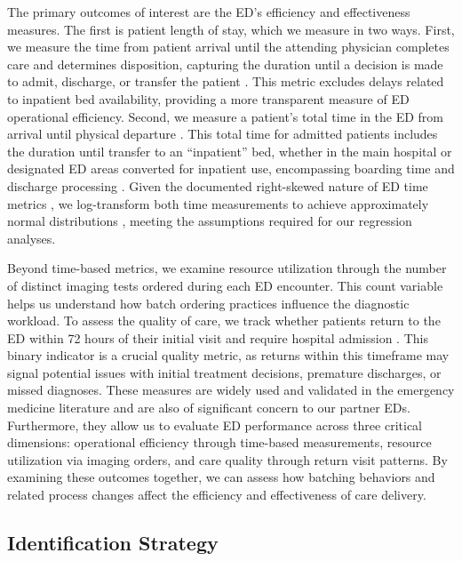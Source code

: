 \documentclass[,,nonblindrev]{informs}
\begin{document}
The primary outcomes of interest are the ED's efficiency and
effectiveness measures. The first is patient length of stay, which we
measure in two ways. First, we measure the time from patient arrival
until the attending physician completes care and determines disposition,
capturing the duration until a decision is made to admit, discharge, or
transfer the patient \citep{Feizi2023}. This metric excludes delays
related to inpatient bed availability, providing a more transparent
measure of ED operational efficiency. Second, we measure a patient's
total time in the ED from arrival until physical departure
\citep{Lim2024}. This total time for admitted patients includes the
duration until transfer to an ``inpatient'' bed, whether in the main
hospital or designated ED areas converted for inpatient use,
encompassing boarding time and discharge processing \citep{Feizi2023}.
Given the documented right-skewed nature of ED time metrics
\citep{Song2015}, we log-transform both time measurements to achieve
approximately normal distributions
\citep[\citet{Saghafian2024}]{Brown2005}, meeting the assumptions
required for our regression analyses.

Beyond time-based metrics, we examine resource utilization through the
number of distinct imaging tests ordered during each ED encounter. This
count variable helps us understand how batch ordering practices
influence the diagnostic workload. To assess the quality of care, we
track whether patients return to the ED within 72 hours of their initial
visit and require hospital admission \citep{Lerman1987}. This binary
indicator is a crucial quality metric, as returns within this timeframe
may signal potential issues with initial treatment decisions, premature
discharges, or missed diagnoses. These measures are widely used and
validated in the emergency medicine literature and are also of
significant concern to our partner EDs. Furthermore, they allow us to
evaluate ED performance across three critical dimensions: operational
efficiency through time-based measurements, resource utilization via
imaging orders, and care quality through return visit patterns. By
examining these outcomes together, we can assess how batching behaviors
and related process changes affect the efficiency and effectiveness of
care delivery.

\subsection{Identification Strategy}\label{sec:identification}
\end{document}
